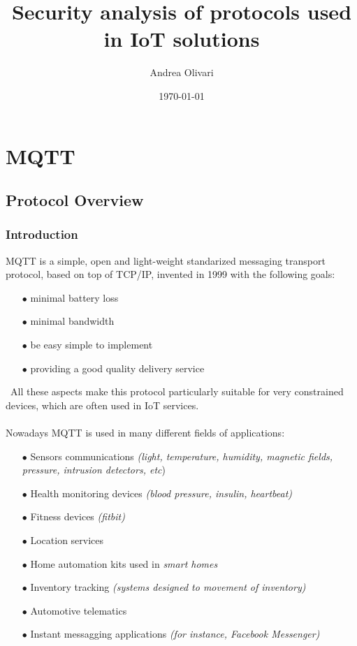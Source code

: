 \documentclass[12pt]{report}
\title{\textbf{Security analysis of protocols used in IoT solutions}}
\author{Andrea Olivari}
\date{\today}
\begin{document}
\maketitle
\tableofcontents{}

\part{MQTT}

\chapter{Protocol Overview}

\section{Introduction}
\bigskip
\textsc{MQTT} is a simple, open and light-weight standarized messaging transport protocol, based on top of TCP/IP, invented in 1999 with the following goals:


\begin{itemize}
\setlength{\itemindent}{+4mm}
  \item[$\bullet$] minimal battery loss
  \item[$\bullet$] minimal bandwidth
  \item[$\bullet$] be easy simple to implement
  \item[$\bullet$] providing a good quality delivery service
\end{itemize}\
All these aspects make this protocol particularly suitable for very constrained devices, which are often used in IoT services.\\\\
Nowadays MQTT is used in many different fields of applications:

 \begin{itemize}
 \setlength{\itemindent}{+4mm}
  \item[$\bullet$] Sensors communications \textit{(light, temperature, humidity, magnetic fields, pressure, intrusion detectors, etc})
  \item[$\bullet$] Health monitoring devices \textit{(blood pressure, insulin, heartbeat)}
  \item[$\bullet$] Fitness devices\textit{ (fitbit)}
  \item[$\bullet$] Location services
  \item[$\bullet$] Home automation kits used in \textit{smart homes}
  \item[$\bullet$] Inventory tracking \textit{(systems designed to movement of inventory)}
  \item[$\bullet$] Automotive telematics
  \item[$\bullet$] Instant messagging applications \textit{(for instance, Facebook Messenger)}
\end{itemize}\
\end{document}
